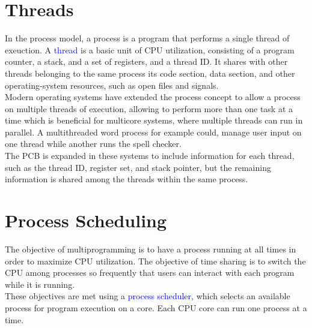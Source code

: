 \documentclass[oneside]{book}
\begin{document}
        \section{Threads}
            In the process model, a process is a program that performs a single thread of exeuction. 
            A \textcolor{blue}{thread} is a basic unit of CPU utilization, consisting of a program counter,
            a stack, and a set of registers, and a thread ID. It shares with other threads belonging to the same
            process its code section, data section, and other operating-system resources, such as open files and signals.\\
            Modern operating systems have extended the process concept to allow a process on multiple threads of execution, allowing to perform more than one task at a time which is beneficial for multicore systems, where multiple threads can run in parallel. A multithreaded word process for example could, manage user input on one thread while another runs the spell checker.\\
            The PCB is expanded in these systems to include information for each thread, such as the thread ID, register set, and stack pointer, but the remaining information is shared among the threads within the same process.
        \section{Process Scheduling}
            The objective of multiprogramming is to have a process running at all times in order to maximize CPU utilization. The objective of time sharing is to switch the CPU among processes so frequently that users can interact with each program while it is running.\\
            These objectives are met using a \textcolor{blue}{process scheduler}, which selects an available process for program execution on a core. Each CPU core can run one process at a time.
\end{document}
